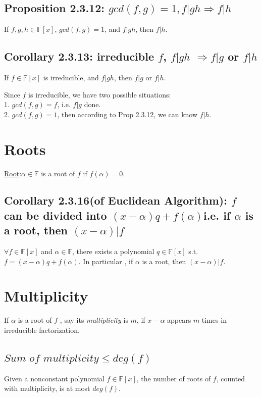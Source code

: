 \documentclass[11pt]{elegantbook}
\begin{document}
{\subsection{Proposition 2.3.12: $gcd(f,g)=1, f|gh\Rightarrow f|h$}
\begin{proposition}[Proposition 2.3.12]
If $f,g,h\in\mathbb{F}[x]$, $gcd(f,g)=1$, and $f|gh$, then $f|h$.
\end{proposition}
\subsection{Corollary 2.3.13: irreducible $f$, $f|gh$ $\Rightarrow f|g$ or $f|h$}
\begin{corollary}[Corollary 2.3.13]
If $f\in\mathbb{F}[x]$ is irreducible, and $f|gh$, then $f|g$ or $f|h$.
\end{corollary}
Since $f$ is irreducible, we have two possible situations:\\
1. $gcd(f,g)=f$, i.e. $f|g$ done.\\
2. $gcd(f,g)=1$, then according to Prop 2.3.12, we can know $f|h$.\\
\section{Roots}
\underline{Root}:$\alpha\in\mathbb{F}$ is a root of $f$ if $f(\alpha)=0$.
\subsection{Corollary 2.3.16(of Euclidean Algorithm): $f$ can be divided into $(x-\alpha)q+f(\alpha)$i.e. if $\alpha$ is a root, then $(x-\alpha)|f$}
\begin{corollary}
$\forall f\in\mathbb{F}[x]$ and $\alpha\in\mathbb{F}$, there exists a polynomial $q\in\mathbb{F}[x]$ s.t. $f=(x-\alpha)q+f(\alpha)$. In particular , if $\alpha$ is a root, then $(x-\alpha)|f$.
\end{corollary}
\section{Multiplicity}
If $\alpha$ is a root of $f$ , say its \textit{multiplicity} is $m$, if $x-\alpha$ appears $m$ times in irreducible factorization.
\subsection{$\textit{Sum of multiplicity}\leq deg(f)$}
\begin{proposition}[Proposition 2.3.17]
Given a nonconstant polynomial $f\in\mathbb{F}[x]$, the number of roots of $f$, counted with multiplicity, is at most $deg(f)$.
\end{proposition}
}
\end{document}
